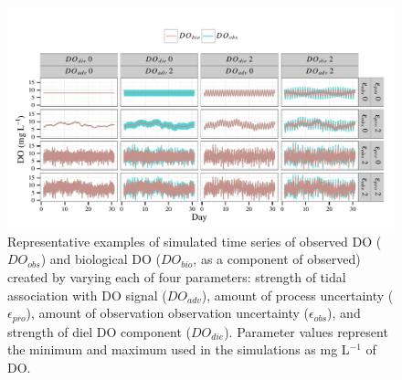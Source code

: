 \documentclass[letterpaper,12pt,oneside]{article}\usepackage[]{graphicx}\usepackage[]{color}
\newenvironment{knitrout}{}{} %
\begin{document}
\centering\vspace*{\fill}
\begin{knitrout}
\color{fgcolor}\begin{figure}[!ht]


{\centering \includegraphics[width=\textwidth]{figure/sim_ex} 

}

\caption[Representative examples of simulated time series of observed \ac{DO} ($DO_{obs}$) and biological \ac{DO} ($DO_{bio}$, as a component of observed) created by varying each of four parameters]{Representative examples of simulated time series of observed \ac{DO} ($DO_{obs}$) and biological \ac{DO} ($DO_{bio}$, as a component of observed) created by varying each of four parameters: strength of tidal association with \ac{DO} signal ($DO_{adv}$), amount of process uncertainty ($\epsilon_{pro}$), amount of observation observation uncertainty ($\epsilon_{obs}$), and strength of diel \ac{DO} component ($DO_{die}$).  Parameter values represent the minimum and maximum used in the simulations as mg L$^{-1}$ of \ac{DO}.\label{fig:sim_ex}}
\end{figure}


\end{knitrout}
\vfill
\clearpage
\end{document}
